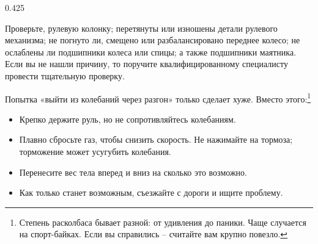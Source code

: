 \begin{langblock}{0.425}
\begin{rus}
		Проверьте, рулевую колонку; перетянуты или изношены детали рулевого механизма; не погнуто ли, смещено или разбалансировано переднее колесо; не ослаблены ли подшипники колеса или спицы; а также подшипники маятника.  Если вы не нашли причину, то поручите квалифицированному специалисту провести тщательную проверку.
		
		Попытка «выйти из колебаний через разгон» только сделает хуже. Вместо этого:\footnote{Степень расколбаса бывает разной: от удивления до паники. Чаще случается на спорт-байках. Если вы справились -- считайте вам крупно повезло.}
		
		\begin{itemize} [noitemsep]
			\item Крепко держите руль, но не сопротивляйтесь колебаниям.
			\item Плавно сбросьте газ, чтобы снизить скорость. Не нажимайте на тормоза; торможение может усугубить колебания.
			\item Перенесите вес тела вперед и вниз на сколько это возможно.
			\item Как только станет возможным, съезжайте с дороги и ищите проблему.
		\end{itemize}
\end{rus}
\end{langblock}





